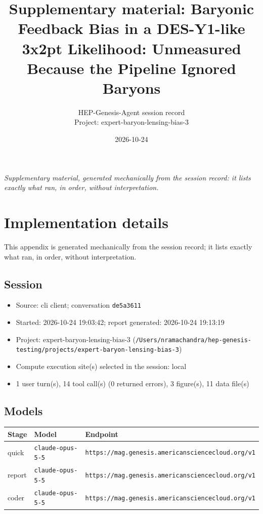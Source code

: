 \documentclass[11pt,a4paper]{article}
\title{Supplementary material: Baryonic Feedback Bias in a DES-Y1-like 3x2pt Likelihood: Unmeasured Because the Pipeline Ignored Baryons}
\author{HEP-Genesis-Agent session record \\ \small Project: expert-baryon-lensing-bias-3}
\date{2026-10-24}
\begin{document}
\maketitle
\noindent\textit{\small Supplementary material, generated mechanically from the session record: it lists exactly what ran, in order, without interpretation.}
\vspace{1em}



\appendix
\section{Implementation details}
\label{app:impl}
This appendix is generated mechanically from the session record; it lists exactly what ran, in order, without interpretation.
\subsection{Session}
\begin{itemize}
  \item Source: cli client; conversation \texttt{de5a3611}
  \item Started: 2026-10-24 19:03:42; report generated: 2026-10-24 19:13:19
  \item Project: expert-baryon-lensing-bias-3 (\texttt{/\allowbreak{}Users/\allowbreak{}nramachandra/\allowbreak{}hep-genesis-testing/\allowbreak{}projects/\allowbreak{}expert-baryon-lensing-bias-3})
  \item Compute execution site(s) selected in the session: local
  \item 1 user turn(s), 14 tool call(s) (0 returned errors), 3 figure(s), 11 data file(s)
\end{itemize}
\subsection{Models}
\begin{longtable}{@{}p{}p{}p{}@{}}
\toprule Stage & Model & Endpoint \\ \midrule \endhead
quick & \texttt{claude-opus-5-5} & \texttt{https:\allowbreak{}/\allowbreak{}/\allowbreak{}mag.genesis.americansciencecloud.org/\allowbreak{}v1} \\
report & \texttt{claude-opus-5-5} & \texttt{https:\allowbreak{}/\allowbreak{}/\allowbreak{}mag.genesis.americansciencecloud.org/\allowbreak{}v1} \\
coder & \texttt{claude-opus-5-5} & \texttt{https:\allowbreak{}/\allowbreak{}/\allowbreak{}mag.genesis.americansciencecloud.org/\allowbreak{}v1} \\
\bottomrule\end{longtable}
\end{document}
